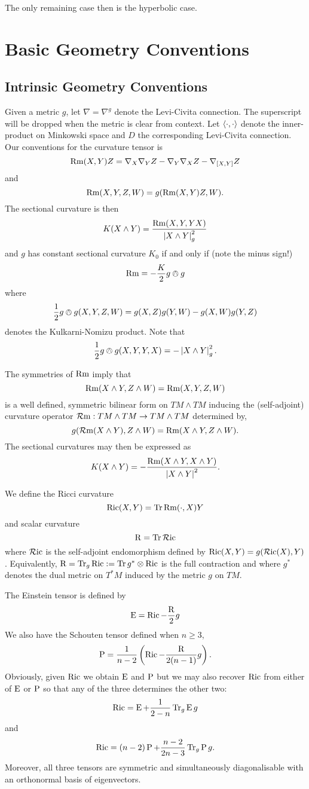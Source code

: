 \documentclass[a4paper, 12pt]{amsart}
\begin{document}
The only remaining case then is the hyperbolic case.

\section{Basic Geometry Conventions}
\label{sec:notation}

\subsection{Intrinsic Geometry Conventions}
\label{subsec:notation_intrinsic}

Given a metric \(g\), let \(\nabla = \nabla^g\) denote the Levi-Civita connection. The superscript will be dropped when the metric is clear from context. Let \(\left\langle \cdot,\cdot \right\rangle\) denote the inner-product on Minkowski space and \(D\) the corresponding Levi-Civita connection. Our conventions for the curvature tensor is
\[
\operatorname{Rm}(X, Y) Z = \nabla_X \nabla_Y Z - \nabla_Y \nabla_X Z - \nabla_{[X, Y]} Z
\]
and
\[
\operatorname{Rm}(X, Y, Z, W) = g(\operatorname{Rm}(X, Y) Z, W).
\]
The sectional curvature is then
\[
K(X \wedge Y) = \frac{\operatorname{Rm}(X, Y, Y X)}{\left\lvert{X \wedge Y}\right\rvert_g^2}
\]
and \(g\) has constant sectional curvature \(K_0\) if and only if (note the minus sign!)
\[
\operatorname{Rm} = -\frac{K}{2} g \owedge g
\]
where
\[
\frac{1}{2} g \owedge g (X, Y, Z, W) = g(X, Z) g (Y, W) - g(X, W) g(Y, Z)
\]
denotes the Kulkarni-Nomizu product. Note that
\[
\frac{1}{2} g \owedge g (X, Y, Y, X) = -\left\lvert{X \wedge Y}\right\rvert_g^2.
\]

The symmetries of \(\operatorname{Rm}\) imply that
\[
\operatorname{Rm}(X\wedge Y, Z \wedge W) = \operatorname{Rm}(X, Y, Z, W)
\]
is a well defined, symmetric bilinear form on \(TM \wedge TM\) inducing the (self-adjoint) curvature operator \(\operatorname{\mathcal{R}m} : TM \wedge TM \to TM \wedge TM\) determined by,
\[
g(\operatorname{\mathcal{R}m}(X\wedge Y), Z \wedge W) = \operatorname{Rm}(X\wedge Y, Z \wedge W).
\]
The sectional curvatures may then be expressed as
\[
K(X \wedge Y) = -\frac{\operatorname{Rm}(X \wedge Y, X \wedge Y)}{\left\lvert{X \wedge Y}\right\rvert^2}.
\]

We define the Ricci curvature
\[
\operatorname{Ric}(X, Y) = \operatorname{Tr} \operatorname{Rm}(\cdot, X) Y
\]
and scalar curvature
\[
\operatorname{R} = \operatorname{Tr} \operatorname{\mathcal{R}ic}
\]
where \(\operatorname{\mathcal{R}ic}\) is the self-adjoint endomorphism defined by \(\operatorname{Ric}(X, Y) = g(\operatorname{\mathcal{R}ic}(X), Y)\). Equivalently, \(\operatorname{R} = \operatorname{Tr}_g \operatorname{Ric} := \operatorname{Tr} g^{\ast} \otimes \operatorname{Ric}\) is the full contraction and where \(g^{\ast}\) denotes the dual metric on \(T^{\ast}M\) induced by the metric \(g\) on \(TM\).

The Einstein tensor is defined by
\[
\operatorname{E} = \operatorname{Ric} - \frac{\operatorname{R}}{2} g
\]
We also have the Schouten tensor defined when \(n \geq 3\),
\[
\operatorname{P} = \frac{1}{n-2} \left(\operatorname{Ric} - \frac{\operatorname{R}}{2(n-1)}g \right).
\]
Obviously, given \(\operatorname{Ric}\) we obtain \(\operatorname{E}\) and \(\operatorname{P}\) but we may also recover \(\operatorname{Ric}\) from either of \(\operatorname{E}\) or \(\operatorname{P}\) so that any of the three determines the other two:
\[
\operatorname{Ric} = \operatorname{E} + \frac{1}{2-n} \operatorname{Tr}_g \operatorname{E} g
\]
and
\[
\operatorname{Ric} = (n-2) \operatorname{P} + \frac{n-2}{2n-3} \operatorname{Tr}_g \operatorname{P} g.
\]
Moreover, all three tensors are symmetric and simultaneously diagonalisable with an orthonormal basis of eigenvectors.
\end{document}
